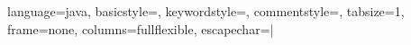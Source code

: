 
 {
   language=java,
   basicstyle=\tiny\ttfamily,
   keywordstyle=\ttfamily,
   commentstyle=\color{gray}\ttfamily,
   tabsize=1,
   frame=none,
   columns=fullflexible,
   escapechar=| %
}